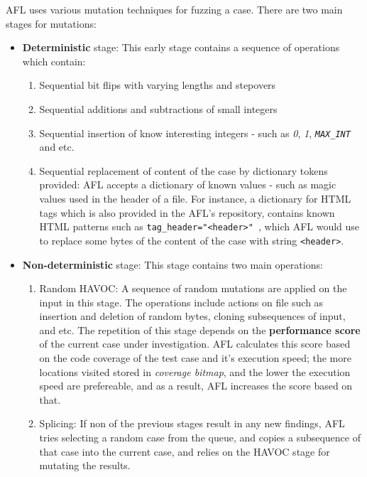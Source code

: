 AFL uses various mutation techniques for fuzzing a case. There are two main stages for mutations:
\begin{itemize}
    \item \textbf{Deterministic} stage: This early stage contains a sequence of operations which contain:
    \begin{enumerate}
        \item Sequential bit flips with varying lengths and stepovers
        \item Sequential additions and subtractions of small integers
        \item Sequential insertion of know interesting integers - such as \textit{0}, \textit{1}, \texttt{\textit{MAX\_INT}} and etc. \cite{about_afl}
        \item Sequential replacement of content of the case by dictionary tokens provided: AFL accepts a dictionary of known values - such as magic values used in the header of a file. For instance, a dictionary for HTML tags which is also provided in the AFL's repository, contains known HTML patterns such as \texttt{tag\_header="<header>"
        }, which AFL would use to replace some bytes of the content of the case with string \texttt{<header>}.
    \end{enumerate}
    
    \item \textbf{Non-deterministic} stage: This stage contains two main operations:
    \begin{enumerate}
        \item Random HAVOC: A sequence of random mutations are applied on the input in this stage. The operations include actions on file such as insertion and deletion of random bytes, cloning subsequences of input, and etc. The repetition of this stage depends on the \textbf{performance score} of the current case under investigation. AFL calculates this score based on the code coverage of the test case and it's execution speed; the more locations visited stored in \textit{coverage bitmap}, and the lower the execution speed are prefereable, and as a result, AFL increases the score based on that. 
        \item Splicing: If non of the previous stages result in any new findings, AFL tries selecting a random case from the queue, and copies a subsequence of that case into the current case, and relies on the HAVOC stage for mutating the results.
    \end{enumerate}
\end{itemize}

